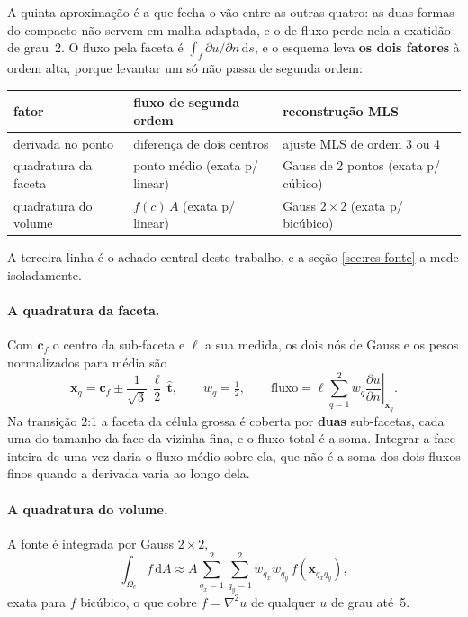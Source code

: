 A quinta aproximação é a que fecha o vão entre as outras quatro: as duas formas
do compacto não servem em malha adaptada, e o de fluxo perde nela a exatidão de
grau~2. O fluxo pela faceta é
$\int_f \partial u/\partial n \,\mathrm{d}s$, e o esquema leva \textbf{os dois
fatores} à ordem alta, porque levantar um só não passa de segunda ordem:

\begin{center}
\begin{tabular}{lll}
\toprule
fator & fluxo de segunda ordem & reconstrução MLS \\
\midrule
derivada no ponto & diferença de dois centros & ajuste MLS de ordem 3 ou 4 \\
quadratura da faceta & ponto médio (exata p/ linear) & Gauss de 2 pontos (exata p/ cúbico) \\
quadratura do volume & $f(c)\,A$ (exata p/ linear) & Gauss $2\times2$ (exata p/ bicúbico) \\
\bottomrule
\end{tabular}
\end{center}

A terceira linha é o achado central deste trabalho, e a seção
\ref{sec:res-fonte} a mede isoladamente.

\paragraph{A quadratura da faceta.} Com $\mathbf{c}_f$ o centro da sub-faceta e
$\ell$ a sua medida, os dois nós de Gauss e os pesos normalizados para média são
\begin{equation}
  \mathbf{x}_q = \mathbf{c}_f \pm \frac{1}{\sqrt{3}}\,\frac{\ell}{2}\,\hat{\mathbf{t}},
  \qquad w_q = \tfrac{1}{2},
  \qquad
  \text{fluxo} = \ell \sum_{q=1}^{2} w_q \left.\frac{\partial u}{\partial n}\right|_{\mathbf{x}_q} .
  \label{eq:gauss-faceta}
\end{equation}
Na transição 2:1 a faceta da célula grossa é coberta por \textbf{duas}
sub-facetas, cada uma do tamanho da face da vizinha fina, e o fluxo total é a
soma. Integrar a face inteira de uma vez daria o fluxo médio sobre ela, que não é
a soma dos dois fluxos finos quando a derivada varia ao longo dela.

\paragraph{A quadratura do volume.} A fonte é integrada por Gauss $2\times2$,
\begin{equation}
  \int_{\Omega_c} f \,\mathrm{d}A \approx
  A \sum_{q_x=1}^{2}\sum_{q_y=1}^{2} w_{q_x} w_{q_y}\, f(\mathbf{x}_{q_x q_y}),
  \label{eq:gauss-volume}
\end{equation}
exata para $f$ bicúbico, o que cobre $f=\nabla^2 u$ de qualquer $u$ de grau até~5.

